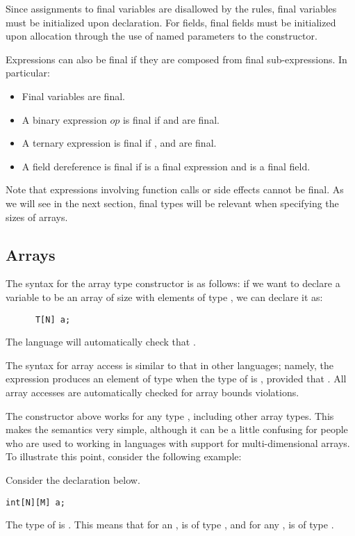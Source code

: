 Since assignments to final variables are disallowed by the rules, final variables must be initialized upon declaration. For fields, final fields must be initialized upon allocation through the use of named parameters to the constructor.

Expressions can also be final if they are composed from final sub-expressions. In particular:

\begin{itemize}
\item Final variables are final.
\item A binary expression   $op$   is final if  and  are final.
\item A ternary expression  is final if , and  are final.
\item A field dereference  is final if  is a final expression and  is a final field.
\end{itemize}

Note that expressions involving function calls or side effects cannot be final. As we will see in the next section, final types will be relevant when specifying the sizes of arrays.

\subsection{Arrays}
The syntax for the array type constructor is as follows: if we want to declare a variable  to be an array of size  with elements of type , we can declare it as:
\begin{lstlisting}
      T[N] a;
\end{lstlisting}
The language will automatically check that .

The syntax for array access is similar to that in other languages; namely, the expression  produces an element of type  when the type of  is , provided that . All array accesses are automatically checked for array bounds violations.

The constructor above works for any type , including other array types. This makes the semantics very simple, although it can be a little confusing for people who are used to working in languages with support for multi-dimensional arrays. To illustrate this point, consider the following example:
\begin{Example}
Consider the declaration below.
\begin{lstlisting}
int[N][M] a;
\end{lstlisting}
The type of  is . This means that for an ,  is of type , and for any ,  is of type .   
\end{Example}

